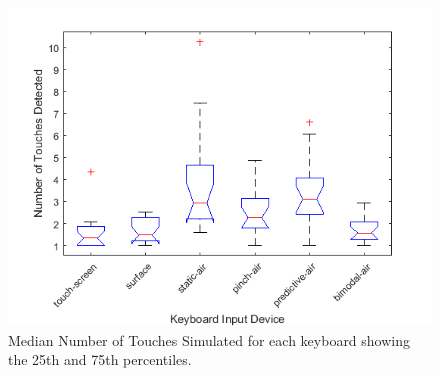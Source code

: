 \begin{figure}[t]
	\centering
	\includegraphics{Figures/fig_num_touches_boxplot}
	\caption[Number of Touches Simulated Boxplot]{Median Number of Touches Simulated for each keyboard showing the 25th and 75th percentiles.}
	\label{fig_num_touches_boxplot}
\end{figure}

